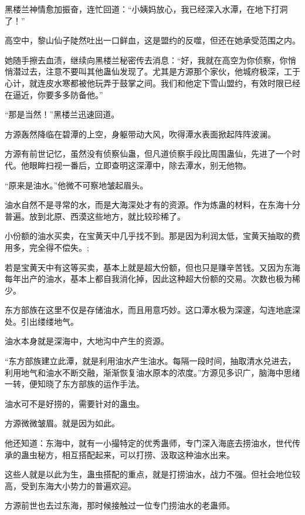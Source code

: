 
\begin{this_body}

黑楼兰神情愈加振奋，连忙回道：“小姨妈放心，我已经深入水潭，在地下打洞了！”

高空中，黎山仙子陡然吐出一口鲜血，这是盟约的反噬，但还在她承受范围之内。

她随手擦去血渍，继续向黑楼兰秘密传去消息：“好，我就在高空为你侦察，你悄悄潜过去，注意不要叫其他蛊仙发现了。尤其是方源那个家伙，他城府极深，工于心计，就连皮水寒都被他玩弄于鼓掌之间。我们和他定下雪山盟约，有效时限已经在逼近，你要多多防备他。”

“那是当然！”黑楼兰迅速回道。

方源轰然降临在碧潭的上空，身躯带动大风，吹得潭水表面掀起阵阵波澜。

方源有前世记忆，虽然没有侦察仙蛊，但凡道侦察手段比周围蛊仙，先进了一个时代。他眼眸扫视一番后，立即查明这深潭中，除去潭水，别无他物。

“原来是油水。”他微不可察地皱起眉头。

油水自然不是寻常的水，而是大海深处才有的资源。作为炼蛊的材料，在东海十分普遍。放到北原、西漠这些地方，就比较珍稀了。

小份额的油水买卖，在宝黄天中几乎找不到。那是因为利润太低，宝黄天抽取的费用多，完全得不偿失。;

若是宝黄天中有这等买卖，基本上就是超大份额，但也只是赚辛苦钱。又因为东海每年出产的油水，基本上都自我消化掉，因此这种超大份额的交易。次数也极为稀少。

东方部族在这里不仅是存储油水，而且用意巧妙。这口潭水极为深邃，勾连地底深处。引出缕缕地气。

油水本身就是深海中，大地沟中产生的资源。

“东方部族建立此潭，就是利用油水产生油水。每隔一段时间，抽取清水兑进去，利用地气和油水不断交融，渐渐恢复油水原本的浓度。”方源见多识广，脑海中思绪一转，便知晓了东方部族的运作手法。

油水可不是好捞的，需要针对的蛊虫。

方源微微皱眉。就是因为如此。

他还知道：东海中，就有一小撮特定的优秀蛊师，专门深入海底去捞油水，世代传承的蛊虫秘方，相互搭配起来，可以打捞、汲取这种油水出来。

这些人就是以此为生，蛊虫搭配的重点，就是打捞油水，战力不强。但社会地位较高，受到东海大小势力的普遍欢迎。

方源前世也去过东海，那时候接触过一位专门捞油水的老蛊师。


\end{this_body}
